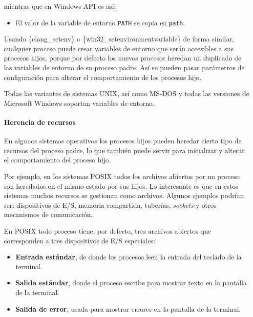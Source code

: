 mientras que en Windows API es así:

\begin{Shaded}
\begin{Highlighting}[]
\OperatorTok{=} \OperatorTok{;}
\OperatorTok{[}\OperatorTok{];}
\OperatorTok{(}\OperatorTok{,}\OperatorTok{,}\OperatorTok{);} 
\end{Highlighting}
\end{Shaded}

\begin{itemize}
\item
  El valor de la variable de entorno \texttt{PATH} se copia en
  \texttt{path}.
\end{itemize}

Usando \{clang\_setenv\} o \{win32\_setenvironmentvariable\} de forma
similar, cualquier proceso puede crear variables de entorno que serán
accesibles a sus procesos hijos, porque por defecto los nuevos procesos
heredan un duplicado de las variables de entorno de su proceso padre.
Así se pueden pasar parámetros de configuración para alterar el
comportamiento de los procesos hijo.

Todas las variantes de sistemas UNIX, así como MS-DOS y todas las
versiones de Microsoft Windows soportan variables de entorno.

\paragraph{Herencia de recursos}\label{_herencia_de_recursos}

En algunos sistemas operativos los procesos hijos pueden heredar cierto
tipo de recursos del proceso padre, lo que también puede servir para
inicializar y alterar el comportamiento del proceso hijo.

Por ejemplo, en los sistemas POSIX todos los archivos abiertos por un
proceso son heredados en el mismo estado por sus hijos. Lo interesante
es que en estos sistemas muchos recursos se gestionan como archivos.
Algunos ejemplos podrían ser: dispositivos de E/S, memoria compartida,
tuberías, \emph{sockets} y otros mecanismos de comunicación.

En POSIX todo proceso tiene, por defecto, tres archivos abiertos que
corresponden a tres dispositivos de E/S especiales:

\begin{itemize}
\item
  \textbf{Entrada estándar}{}, de donde los procesos leen la entrada del
  teclado de la terminal.
\item
  \textbf{Salida estándar}{}, donde el proceso escribe para mostrar
  texto en la pantalla de la terminal.
\item
  \textbf{Salida de error}{}, usada para mostrar errores en la pantalla
  de la terminal.
\end{itemize}

